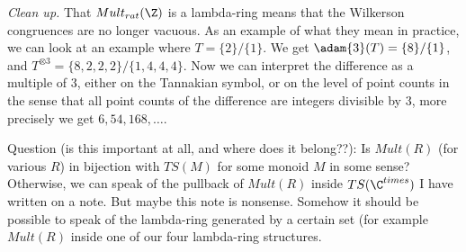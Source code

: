 \begin{example}
\emph{Clean up.} That $Mult_{rat}(\Z)$ is a lambda-ring means that the Wilkerson congruences are no longer vacuous. As an example of what they mean in practice, we can look at an example where $T = \{   2 \}  /  \{ 1    \}$. We get $\adam{3}(T) = \{   8 \}  /  \{ 1    \}$, and $T^{\otimes 3} = \{   8, 2, 2, 2 \}  /  \{ 1, 4, 4, 4    \}$. Now we can interpret the difference as a multiple of 3, either on the Tannakian symbol, or on the level of point counts in the sense that all point counts of the difference are integers divisible by 3, more precisely we get $6, 54, 168, \ldots$.
\end{example}



Question (is this important at all, and where does it belong??): Is $Mult(R)$ (for various $R$) in bijection with $TS(M)$ for some monoid $M$ in some sense? Otherwise, we can speak of the pullback of $Mult(R)$ inside $TS(\C^{times})$ I have written on a note. But maybe this note is nonsense. Somehow it should be possible to speak of the lambda-ring generated by a certain set (for example $Mult(R)$ inside one of our four lambda-ring structures.










